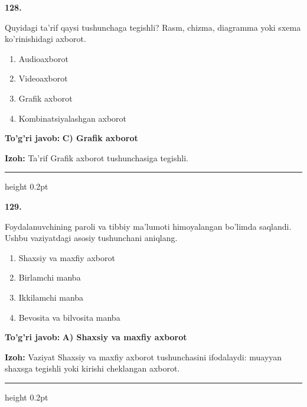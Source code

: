 \documentclass[10pt,a4paper,oneside]{article}
\begin{document}
\noindent\textbf{\color{ink}128.}
\par
Quyidagi ta'rif qaysi tushunchaga tegishli? Rasm, chizma, diagramma yoki sxema ko'rinishidagi axborot.
\begin{enumerate}[label=\Alph*),leftmargin=9mm]
\item Audioaxborot
\item Videoaxborot
\item Grafik axborot
\item Kombinatsiyalashgan axborot
\end{enumerate}
\begin{tcolorbox}[enhanced,breakable,colback=teal!4,colframe=teal!50!black,boxrule=0.5pt,arc=1.1mm,left=3mm,right=3mm,top=1.7mm,bottom=1.7mm,before skip=2mm,after skip=2mm]
\textbf{\color{teal}To'g'ri javob:} \textbf{C) Grafik axborot}
\par\smallskip
\textbf{Izoh:} Ta'rif Grafik axborot tushunchasiga tegishli.
\end{tcolorbox}
\vspace{2mm}\hrule height 0.2pt \vspace{3mm}

\noindent\textbf{\color{ink}129.}
\par
Foydalanuvchining paroli va tibbiy ma'lumoti himoyalangan bo'limda saqlandi. Ushbu vaziyatdagi asosiy tushunchani aniqlang.
\begin{enumerate}[label=\Alph*),leftmargin=9mm]
\item Shaxsiy va maxfiy axborot
\item Birlamchi manba
\item Ikkilamchi manba
\item Bevosita va bilvosita manba
\end{enumerate}
\begin{tcolorbox}[enhanced,breakable,colback=teal!4,colframe=teal!50!black,boxrule=0.5pt,arc=1.1mm,left=3mm,right=3mm,top=1.7mm,bottom=1.7mm,before skip=2mm,after skip=2mm]
\textbf{\color{teal}To'g'ri javob:} \textbf{A) Shaxsiy va maxfiy axborot}
\par\smallskip
\textbf{Izoh:} Vaziyat Shaxsiy va maxfiy axborot tushunchasini ifodalaydi: muayyan shaxsga tegishli yoki kirishi cheklangan axborot.
\end{tcolorbox}
\vspace{2mm}\hrule height 0.2pt \vspace{3mm}
\end{document}
